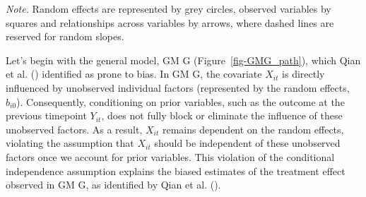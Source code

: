 \documentclass[
  11pt,
  a4paper,
]{article}
\begin{document}
\begin{figure}[H]
\begin{minipage}{0.50\linewidth}
{}

\end{minipage}%
%
\begin{minipage}{0.50\linewidth}



\end{minipage}%

\end{figure}%

\emph{Note.} Random effects are represented by grey circles, observed
variables by squares and relationships across variables by arrows, where
dashed lines are reserved for random slopes.

\vspace{2em}

Let's begin with the general model, GM G (Figure~\ref{fig-GMG_path}),
which Qian et al. () identified as prone to
bias. In GM G, the covariate \(X_{it}\) is directly influenced by
unobserved individual factors (represented by the random effects,
\(b_{i0}\)). Consequently, conditioning on prior variables, such as the
outcome at the previous timepoint \(Y_{it}\), does not fully block or
eliminate the influence of these unobserved factors. As a result,
\(X_{it}\) remains dependent on the random effects, violating the
assumption that \(X_{it}\) should be independent of these unobserved
factors once we account for prior variables. This violation of the
conditional independence assumption explains the biased estimates of the
treatment effect observed in GM G, as identified by Qian et al.
().
\end{document}

